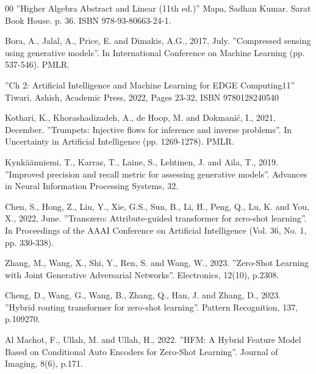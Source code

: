 \documentclass{article}
\begin{document}
\begin{thebibliography}{00}
 ''Higher Algebra Abstract and Linear (11th ed.)'' Mapa, Sadhan Kumar. Sarat Book House. p. 36. ISBN 978-93-80663-24-1.

 Bora, A., Jalal, A., Price, E. and Dimakis, A.G., 2017, July. ''Compressed sensing using generative models''. In International Conference on Machine Learning (pp. 537-546). PMLR.

 ''Ch 2: Artificial Intelligence and Machine Learning for EDGE Computing11'' Tiwari, Ashish, Academic Press, 2022, Pages 23-32, ISBN 9780128240540

 Kothari, K., Khorashadizadeh, A., de Hoop, M. and Dokmanić, I., 2021, December. ''Trumpets: Injective flows for inference and inverse problems''. In Uncertainty in Artificial Intelligence (pp. 1269-1278). PMLR.

 Kynkäänniemi, T., Karras, T., Laine, S., Lehtinen, J. and Aila, T., 2019. ''Improved precision and recall metric for assessing generative models''. Advances in Neural Information Processing Systems, 32.

 Chen, S., Hong, Z., Liu, Y., Xie, G.S., Sun, B., Li, H., Peng, Q., Lu, K. and You, X., 2022, June. ''Transzero: Attribute-guided transformer for zero-shot learning''. In Proceedings of the AAAI Conference on Artificial Intelligence (Vol. 36, No. 1, pp. 330-338).

 Zhang, M., Wang, X., Shi, Y., Ren, S. and Wang, W., 2023. ''Zero-Shot Learning with Joint Generative Adversarial Networks''. Electronics, 12(10), p.2308.

 Cheng, D., Wang, G., Wang, B., Zhang, Q., Han, J. and Zhang, D., 2023. ''Hybrid routing transformer for zero-shot learning''. Pattern Recognition, 137, p.109270.

 Al Machot, F., Ullah, M. and Ullah, H., 2022. ''HFM: A Hybrid Feature Model Based on Conditional Auto Encoders for Zero-Shot Learning''. Journal of Imaging, 8(6), p.171.

\end{thebibliography}
\end{document}
